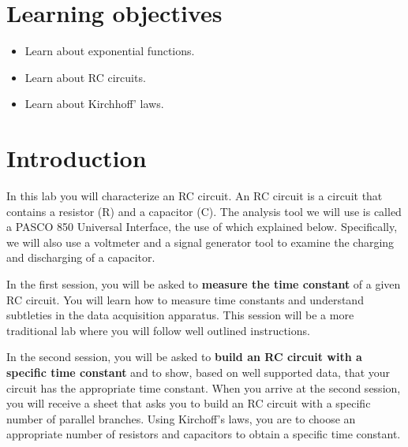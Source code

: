 \documentclass[12pt]{report}
\begin{document}
\section{Learning objectives}
\begin{itemize}
\item Learn about exponential functions.
\item Learn about RC circuits.
\item Learn about Kirchhoff' laws.
\end{itemize}

\section{Introduction}
In this lab you will characterize an RC circuit. An RC circuit is a circuit that contains a resistor (R) and a capacitor (C). The analysis tool we will use is called a PASCO 850 Universal Interface, the use of which explained below. Specifically, we will also use a voltmeter and a
signal generator tool to examine the charging and discharging of a capacitor. 

In the first session, you will be asked to \textbf{measure the time constant} of a given RC circuit. You will learn how to measure time constants and understand subtleties in the data acquisition apparatus. This session will be a more traditional lab where you will follow well outlined instructions. 

In the second session, you will be asked to \textbf{build an RC circuit with a specific time constant} and to show, based on well supported data, that your circuit has the appropriate time constant. When you arrive at the second session, you will receive a sheet that asks you to build an RC circuit with a specific number of parallel branches. Using Kirchoff's laws, you are to choose an appropriate number of resistors and capacitors to obtain a specific time constant.
\end{document}
